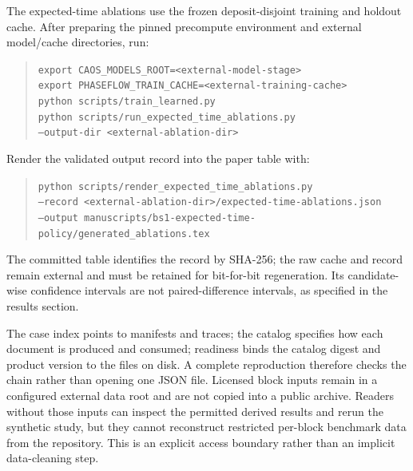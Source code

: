 \documentclass[11pt]{article}
\begin{document}
The expected-time ablations use the frozen deposit-disjoint training and holdout cache. After preparing the pinned precompute environment and external model/cache directories, run:
\begin{quote}\scriptsize
\texttt{export CAOS\_MODELS\_ROOT=<external-model-stage>}\\
\texttt{export PHASEFLOW\_TRAIN\_CACHE=<external-training-cache>}\\
\texttt{python scripts/train\_learned.py}\\
\texttt{python scripts/run\_expected\_time\_ablations.py}\\
\texttt{--output-dir <external-ablation-dir>}
\end{quote}
Render the validated output record into the paper table with:
\begin{quote}\footnotesize
\texttt{python scripts/render\_expected\_time\_ablations.py}\\
\texttt{--record <external-ablation-dir>/expected-time-ablations.json}\\
\texttt{--output manuscripts/bs1-expected-time-policy/generated\_ablations.tex}
\end{quote}
The committed table identifies the record by SHA-256; the raw cache and record remain external and must be retained for bit-for-bit regeneration. Its candidate-wise confidence intervals are not paired-difference intervals, as specified in the results section.

The case index points to manifests and traces; the catalog specifies how each document is produced and consumed; readiness binds the catalog digest and product version to the files on disk. A complete reproduction therefore checks the chain rather than opening one JSON file. Licensed block inputs remain in a configured external data root and are not copied into a public archive. Readers without those inputs can inspect the permitted derived results and rerun the synthetic study, but they cannot reconstruct restricted per-block benchmark data from the repository. This is an explicit access boundary rather than an implicit data-cleaning step.
\end{document}
